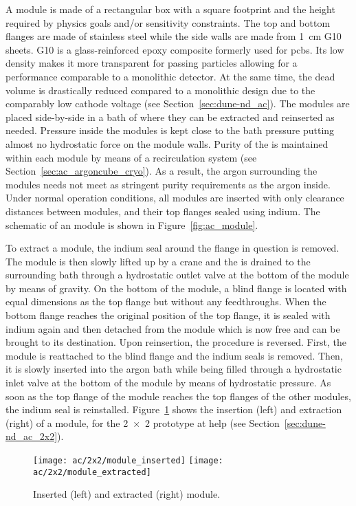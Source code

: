 A module is made of a rectangular box with a square footprint and the height required by physics goals and/or sensitivity constraints.
The top and bottom flanges are made of stainless steel while the side walls are made from \SI{1}{\centi\metre} G10 sheets.
G10 is a glass-reinforced epoxy composite formerly used for \glspl{pcb}.
Its low density makes it more transparent for passing particles allowing for a performance comparable to a monolithic detector.
At the same time, the dead volume is drastically reduced compared to a monolithic design due to the comparably low cathode voltage (see Section~\ref{sec:dune-nd_ac}).
The modules are placed side-by-side in a bath of \lar{} where they can be extracted and reinserted as needed.
Pressure inside the modules is kept close to the bath pressure putting almost no hydrostatic force on the module walls.
Purity of the \lar{} is maintained within each module by means of a recirculation system (see Section~\ref{sec:ac_argoncube_cryo}).
As a result, the argon surrounding the modules needs not meet as stringent purity requirements as the argon inside.
Under normal operation conditions, all modules are inserted with only clearance distances between modules, and their top flanges sealed using indium.
The schematic of an \AC{} module is shown in Figure~\ref{fig:ac_module}.

To extract a module, the indium seal around the flange in question is removed.
The module is then slowly lifted up by a crane and the \lar{} is drained to the surrounding bath through a hydrostatic outlet valve at the bottom of the module by means of gravity.
On the bottom of the module, a blind flange is located with equal dimensions as the top flange but without any feedthroughs.
When the bottom flange reaches the original position of the top flange, it is sealed with indium again and then detached from the module which is now free and can be brought to its destination.
Upon reinsertion, the procedure is reversed.
First, the module is reattached to the blind flange and the indium seals is removed.
Then, it is slowly inserted into the argon bath while being filled through a hydrostatic inlet valve at the bottom of the module by means of hydrostatic pressure.
As soon as the top flange of the module reaches the top flanges of the other modules, the indium seal is reinstalled.
Figure~\ref{fig:ac_module-ins-ext} shows the insertion (left) and extraction (right) of a module, for the \num{2 x 2} prototype at \gls{help} (see Section~\ref{sec:dune-nd_ac_2x2}).

\begin{figure}[htb]
	\centering
	\texttt{[image: ac/2x2/module\_inserted]}
	\texttt{[image: ac/2x2/module\_extracted]}
	\caption[\AC{} module insertion and extraction]{%
		Inserted (left) and extracted (right) module.
	}
	\label{fig:ac_module-ins-ext}
\end{figure}


